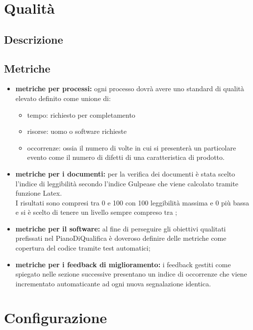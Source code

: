 \documentclass[NormeDiProgetto.tex]{subfiles}
\begin{document}
	\section{Qualità}
	\subsection{Descrizione}
	\subsection{Metriche}
	\begin{itemize}
		\item \textbf{metriche per processi:} ogni processo dovrà avere uno standard di qualità elevato definito come unione di:
		\begin{itemize}
			\item tempo: richiesto per completamento
			\item risorse: uomo o software richieste
			\item occorrenze: ossia il numero di volte in cui si presenterà un particolare evento come il numero di difetti di una caratteristica di prodotto. 
		\end{itemize} 
		
		\item \textbf{metriche per i documenti:} per la verifica dei documenti è stata scelto l'indice di leggibilità secondo l'indice Gulpease che viene calcolato tramite funzione Latex.\\I risultati sono compresi tra 0 e 100 con 100 leggibilità massima e 0 più bassa e si è scelto di tenere un livello sempre compreso tra ;%
		
		\item \textbf{metriche per il software:} al fine di perseguire gli obiettivi qualitati prefissati nel PianoDiQualifica è doveroso definire delle metriche come copertura del codice tramite test automatici; %
		\item \textbf{metriche per i feedback di miglioramento:} i feedback gestiti come spiegato nelle sezione successive presentano un indice di occorrenze che viene incrementato automaticante ad ogni nuova segnalazione identica. 
	\end{itemize}

	
	\section{Configurazione}
	
\end{document}
